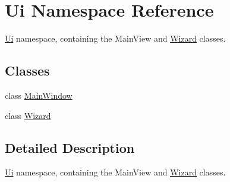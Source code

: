 \hypertarget{namespace_ui}{}\section{Ui Namespace Reference}
\label{namespace_ui}


\hyperlink{namespace_ui}{Ui} namespace, containing the Main\+View and \hyperlink{class_ui_1_1_wizard}{Wizard} classes.  


\subsection*{Classes}
\begin{DoxyCompactItemize}
\item 
class \hyperlink{class_ui_1_1_main_window}{Main\+Window}
\item 
class \hyperlink{class_ui_1_1_wizard}{Wizard}
\end{DoxyCompactItemize}


\subsection{Detailed Description}
\hyperlink{namespace_ui}{Ui} namespace, containing the Main\+View and \hyperlink{class_ui_1_1_wizard}{Wizard} classes. 